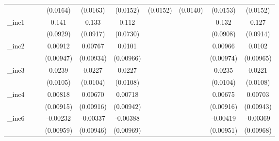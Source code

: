\begin{table}[htbp]
\begin{tabular}{l*{9}{c}}
            &                     &                     &    (0.0164)         &    (0.0163)         &    (0.0152)         &    (0.0152)         &    (0.0140)         &    (0.0153)         &    (0.0152)         \\
[1em]
\_inc1       &                     &                     &       0.141         &       0.133         &       0.112         &                     &                     &       0.132         &       0.127         \\
            &                     &                     &    (0.0929)         &    (0.0917)         &    (0.0730)         &                     &                     &    (0.0908)         &    (0.0914)         \\
[1em]
\_inc2       &                     &                     &     0.00912         &     0.00767         &      0.0101         &                     &                     &     0.00966         &      0.0102         \\
            &                     &                     &   (0.00947)         &   (0.00934)         &   (0.00966)         &                     &                     &   (0.00974)         &   (0.00965)         \\
[1em]
\_inc3       &                     &                     &      0.0239\sym{**} &      0.0227\sym{**} &      0.0227\sym{**} &                     &                     &      0.0235\sym{**} &      0.0221\sym{**} \\
            &                     &                     &    (0.0105)         &    (0.0104)         &    (0.0108)         &                     &                     &    (0.0104)         &    (0.0108)         \\
[1em]
\_inc4       &                     &                     &     0.00818         &     0.00670         &     0.00718         &                     &                     &     0.00675         &     0.00703         \\
            &                     &                     &   (0.00915)         &   (0.00916)         &   (0.00942)         &                     &                     &   (0.00916)         &   (0.00943)         \\
[1em]
\_inc6       &                     &                     &    -0.00232         &    -0.00337         &    -0.00388         &                     &                     &    -0.00419         &    -0.00369         \\
            &                     &                     &   (0.00959)         &   (0.00946)         &   (0.00969)         &                     &                     &   (0.00951)         &   (0.00968)         \\

\end{tabular}
\end{table}
